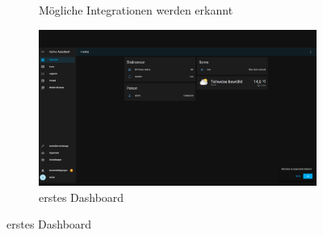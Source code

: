 \begin{figure}[H]
\begin{subfigure}{.5\linewidth}
        \caption[Mögliche Integrationen werden erkannt]{Mögliche Integrationen werden erkannt}
        \label{fig:ha3}
    \end{subfigure}
    \begin{subfigure}{.5\linewidth}
        \includegraphics[width=1\textwidth]{img/HA5.png}
        \caption{erstes Dashboard}
        \label{fig:ha4}
    \end{subfigure}
    \label{fig:Einrichtung des Home Assistant}
\end{figure}





